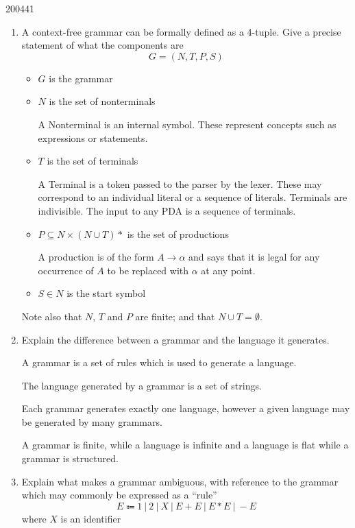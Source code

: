 \documentclass[10pt,\jkfside,a4paper]{article}
\begin{document}
\begin{examquestion}{2004}{4}{1}

\begin{enumerate}

\item A context-free grammar can be formally defined as a 4-tuple. Give a 
precise statement of what the components are
\[
G = (N, T, P, S)
\]

\begin{itemize}

\item $G$ is the grammar

\item $N$ is the set of nonterminals

A Nonterminal is an internal symbol. These represent concepts such as
expressions or statements.

\item $T$ is the set of terminals

A Terminal is a token passed to the parser by the lexer. These may
correspond to an individual literal or a sequence of literals. Terminals are
indivisible. The input to any PDA is a sequence of terminals.

\item $P \subseteq N \times (N \cup T)*$ is the set of productions

A production is of the form $A \to \alpha$ and says that it is legal for any
occurrence of $A$ to be replaced with $\alpha$ at any point.

\item $S \in N$ is the start symbol

\end{itemize}

Note also that $N$, $T$ and $P$ are finite; and that $N \cup T = \emptyset$.

\item Explain the difference between a grammar and the language it generates.

A grammar is a set of rules which is used to generate a language.

The language generated by a grammar is a set of strings.

Each grammar generates exactly one language, however a given language may be
generated by many grammars.

A grammar is finite, while a language is infinite and a language is flat
while a grammar is structured.

\item Explain what makes a grammar ambiguous, with reference to the grammar 
which may commonly be expressed as a ``rule''
\[
E \Coloneqq 1 \ | \ 2 \ | \ X \ | \ E + E \ | \ E * E \ | \ - E
\]
where $X$ is an identifier


\end{enumerate}
\end{examquestion}
\end{document}
